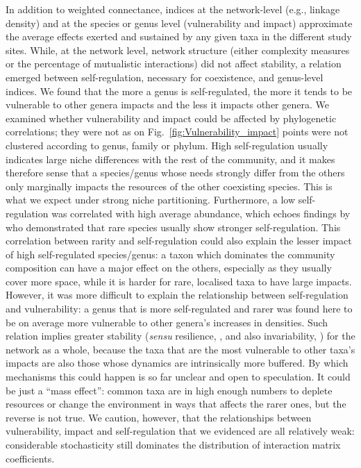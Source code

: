 \documentclass[10pt]{article}
\begin{document}
In addition to weighted connectance, indices at the network-level
(e.g., linkage density) and at the species or genus level (vulnerability
and impact) approximate the average effects exerted and sustained
by any given taxa in the different study sites. While, at the network
level, network structure (either complexity measures or the percentage
of mutualistic interactions) did not affect stability, a relation
emerged between self-regulation, necessary for coexistence, and genus-level
indices. We found that the more a genus is self-regulated, the more
it tends to be vulnerable to other genera impacts and the less it
impacts other genera. We examined whether vulnerability and impact
could be affected by phylogenetic correlations; they were not as on
Fig.~\ref{fig:Vulnerability_impact} points were not clustered according
to genus, family or phylum. High self-regulation usually indicates
large niche differences with the rest of the community, and it makes
therefore sense that a species/genus whose needs strongly differ from
the others only marginally impacts the resources of the other coexisting
species. This is what we expect under strong niche partitioning. Furthermore,
a low self-regulation was correlated with high average abundance,
which echoes findings by \citet{yenni_persistent_2017} who demonstrated
that rare species usually show stronger self-regulation. This correlation
between rarity and self-regulation could also explain the lesser impact of high self-regulated species/genus: a taxon which dominates
the community composition can have a major effect on the others, especially
as they usually cover more space, while it is harder for rare, localised
taxa to have large impacts. However, it was more difficult to explain
the relationship between self-regulation and vulnerability: a genus
that is more self-regulated and rarer was found here to be on average
more vulnerable to other genera's increases in densities. Such relation
implies greater stability (\emph{sensu} resilience, \citealt{ives_estimating_2003},
and also invariability, \citealt{Arnoldi431296}) for the network
as a whole, because the taxa that are the most vulnerable to other
taxa's impacts are also those whose dynamics are intrinsically more
buffered. By which mechanisms this could happen is so far unclear
and open to speculation. It could be just a ``mass effect'': common
taxa are in high enough numbers to deplete resources or change the
environment in ways that affects the rarer ones, but the reverse is
not true. We caution, however, that the relationships between vulnerability,
impact and self-regulation that we evidenced are all relatively weak:
considerable stochasticity still dominates the distribution of interaction
matrix coefficients.
\end{document}
